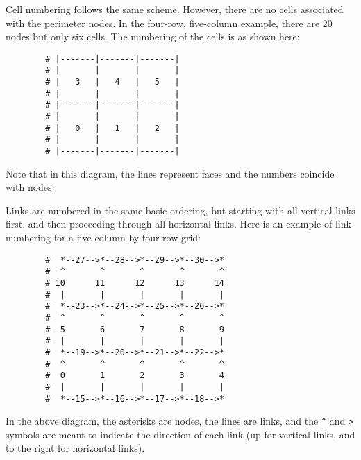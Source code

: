 \documentclass[12pt]{amsart}
\begin{document}
Cell numbering follows the same scheme. However, there are no cells associated with the perimeter nodes. In the four-row, five-column example, there are 20 nodes but only six cells. The numbering of the cells is as shown here:
\begin{verbatim}
        # |-------|-------|-------|
        # |       |       |       |
        # |   3   |   4   |   5   |
        # |       |       |       |
        # |-------|-------|-------|
        # |       |       |       |
        # |   0   |   1   |   2   |
        # |       |       |       |
        # |-------|-------|-------|
\end{verbatim}
Note that in this diagram, the lines represent faces and the numbers coincide with nodes.

Links are numbered in the same basic ordering, but starting with all vertical links first, and then proceeding through all horizontal links. Here is an example of link numbering for a five-column by four-row grid:
\newpage
\begin{verbatim}
        #  *--27-->*--28-->*--29-->*--30-->*
        #  ^       ^       ^       ^       ^
        # 10      11      12      13      14
        #  |       |       |       |       |
        #  *--23-->*--24-->*--25-->*--26-->*
        #  ^       ^       ^       ^       ^
        #  5       6       7       8       9   
        #  |       |       |       |       |
        #  *--19-->*--20-->*--21-->*--22-->*
        #  ^       ^       ^       ^       ^
        #  0       1       2       3       4
        #  |       |       |       |       |
        #  *--15-->*--16-->*--17-->*--18-->*
\end{verbatim}
In the above diagram, the asterisks are nodes, the lines are links, and the \verb!^! and \verb!>! symbols are meant to indicate the direction of each link (up for vertical links, and to the right for horizontal links).




%
%
%
%
%
%        
%
%
%
%
%
\end{document}
